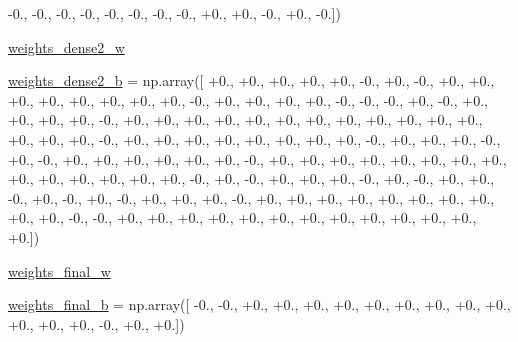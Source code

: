 \begin{DoxyCompactItemize}
-\/0., -\/0., -\/0., -\/0., -\/0., -\/0., -\/0., -\/0., +0., +0., -\/0., +0., -\/0.\mbox{]})
\item 
\hyperlink{namespacepybullet-gym_1_1pybulletgym_1_1examples_1_1roboschool-weights_1_1enjoy___t_f___humanoid5ce30284d6415ebf8c921e22a512fe3a_aa9eb77fd8e8bf9b26631fe38772dfaa6}{weights\+\_\+dense2\+\_\+w}
\item 
\hyperlink{namespacepybullet-gym_1_1pybulletgym_1_1examples_1_1roboschool-weights_1_1enjoy___t_f___humanoid5ce30284d6415ebf8c921e22a512fe3a_a99b3c1a8b18d1c14c2562468c846cde4}{weights\+\_\+dense2\+\_\+b} = np.\+array(\mbox{[} +0., +0., +0., +0., +0., -\/0., +0., -\/0., +0., +0., +0., +0., +0., +0., +0., +0., -\/0., +0., +0., +0., +0., -\/0., -\/0., -\/0., +0., -\/0., +0., +0., +0., +0., -\/0., +0., +0., +0., +0., +0., +0., +0., +0., +0., +0., +0., +0., +0., +0., +0., -\/0., +0., +0., +0., +0., +0., +0., +0., +0., -\/0., +0., +0., +0., -\/0., +0., -\/0., +0., +0., +0., +0., +0., +0., -\/0., +0., +0., +0., +0., +0., +0., +0., +0., +0., +0., +0., +0., +0., +0., -\/0., +0., -\/0., +0., +0., +0., -\/0., +0., -\/0., +0., +0., -\/0., +0., -\/0., +0., -\/0., +0., +0., +0., -\/0., +0., +0., +0., +0., +0., +0., +0., +0., +0., +0., -\/0., -\/0., +0., +0., +0., +0., +0., +0., +0., +0., +0., +0., +0., +0., +0.\mbox{]})
\item 
\hyperlink{namespacepybullet-gym_1_1pybulletgym_1_1examples_1_1roboschool-weights_1_1enjoy___t_f___humanoid5ce30284d6415ebf8c921e22a512fe3a_ac6978b8d447f9cb022a26bad2cced2e5}{weights\+\_\+final\+\_\+w}
\item 
\hyperlink{namespacepybullet-gym_1_1pybulletgym_1_1examples_1_1roboschool-weights_1_1enjoy___t_f___humanoid5ce30284d6415ebf8c921e22a512fe3a_a60e6ce57331be36c1375fac261ef92c8}{weights\+\_\+final\+\_\+b} = np.\+array(\mbox{[} -\/0., -\/0., +0., +0., +0., +0., +0., +0., +0., +0., +0., +0., +0., +0., -\/0., +0., +0.\mbox{]})
\end{DoxyCompactItemize}



